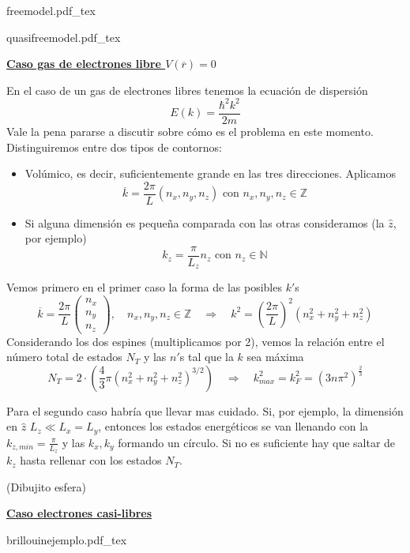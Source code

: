 \documentclass[leqno]{article}
\newcommand{\incfig}[1]{%
\center
\def\svgwidth{0.9\columnwidth}
{#1.pdf_tex}
}
\begin{document}
\begin{minipage}{0.5\textwidth}
  \incfig{freemodel}
\end{minipage}
\begin{minipage}{0.5\textwidth}
  \incfig{quasifreemodel}
\end{minipage}

\underline{\textbf{Caso gas de electrones libre $V(\overline{r})=0$}}

En el caso de un gas de electrones libres tenemos la ecuación de dispersión
\[
E(k) = \frac{\hbar ^2 k^2}{2m}
\] 
Vale la pena pararse a discutir sobre cómo es el problema en este momento. Distinguiremos entre dos tipos de contornos:
\begin{itemize}[topsep=-6pt, itemsep=0pt]
  \item Volúmico, es decir, suficientemente grande en las tres direcciones. Aplicamos
	\[
	\overline{k} = \frac{2\pi }{L} (n_x, n_y, n_z) \text{ con } n_x, n_y, n_z \in \mathbb{Z}
	\] 
  \item Si alguna dimensión es pequeña comparada con las otras consideramos (la $\hat{z}$, por ejemplo)
	\[
	k_z = \frac{\pi}{L_z} n_z \text{ con } n_z \in \mathbb{N}
	\] 
\end{itemize}


Vemos primero en el primer caso la forma de las posibles $k'$s
\[
  \overline{k} = \frac{2\pi }{L} \begin{pmatrix} n_x\\n_y\\n_z \end{pmatrix}, \quad n_x, n_y, n_z\in \mathbb{Z} \quad \Rightarrow \quad k^2 = \left( \frac{2\pi }{L} \right)^2 (n_x^2+n_y^2+n_z^2)  
\] 
Considerando los dos espines (multiplicamos por 2), vemos la relación entre el número total de estados $N_T$ y las $n'$s tal que la $k$ sea máxima
\[
N_T = 2 \cdot \left( \frac{4}{3}\pi (n_x^2+n_y^2+n_z^2)^{3 / 2} \right) \quad \Rightarrow \quad k_{max}^2 = k_F^2 = (3n\pi ^2) ^{ \frac{2}{3}}
\] 

Para el segundo caso habría que llevar mas cuidado. Si, por ejemplo, la dimensión en $\hat{z}$ $L_z\ll L_x=L_y$, entonces los estados energéticos se van llenando con la $k_{z, min} = \frac{\pi}{L_z}$ y las $k_x, k_y$ formando un círculo. Si no es suficiente hay que saltar de  $k_z$ hasta rellenar con los estados $N_T$.

(Dibujito esfera)

\underline{\textbf{Caso electrones casi-libres}}


\incfig{brillouinejemplo}
\end{document}
